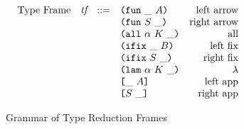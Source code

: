 \documentclass[../plutus-core-specification.tex]{subfiles}
\begin{document}

\newcommand\tf{\textit{tf}}  %


\begin{figure}[H]

\begin{subfigure}[c]{\linewidth}
    \[\begin{array}{lrclr}
        \textrm{Type Frame} &\tf & ::= %
                                       & \inFunTLeftFrame{A}                        & \textrm{left arrow}\\
                            &    &     & \inFunTRightFrame{S}                       & \textrm{right arrow}\\
                            &    &     & \inAllTFrame{\alpha}{K}                    & \textrm{all}\\
                            &	 &     & \inFixTLeftFrame{B}                        & \textrm{left fix}\\
                            &    &     & \inFixTRightFrame{S}                       & \textrm{right fix}\\
                            &    &     & \inLamTFrame{\alpha}{K}                    & \textrm{$\lambda$}\\
                            &    &     & \inAppTLeftFrame{A}                        & \textrm{left app}\\
                            &    &     & \inAppTRightFrame{S}                       & \textrm{right app}\\
    \end{array}\]

    \caption{Grammar of Type Reduction Frames}
    \label{fig:type_reduction_frames}
\end{subfigure}




\begin{subfigure}[c]{\linewidth}


\end{subfigure}
\end{figure}
\end{document}
